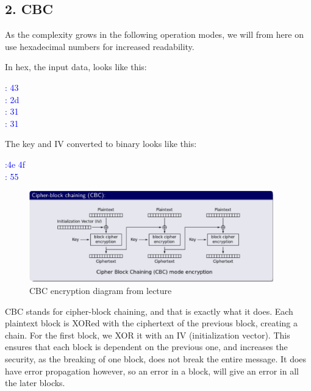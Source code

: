 \documentclass{article}
\begin{document}
\newpage
\subsection{2. CBC}

As the complexity grows in the following operation modes, we will from here on use hexadecimal numbers for increased readability.

In hex, the  input data, looks like this:
\begin{tcolorbox}
\begin{center}
\textcolor{blue}{
: 43\\
: 2d\\
: 31\\
: 31}
\end{center}
\end{tcolorbox}

The key and IV converted to binary looks like this: 
\begin{tcolorbox}
\begin{center}
\textcolor{blue}{
:\qquad4e 4f\\
: 55}
\end{center}
\end{tcolorbox}


\begin{figure}[H]
 \centering
  \includegraphics[width=300pt]{img/cbcLecture.png}
 \caption{CBC encryption diagram from lecture}
 \end{figure}

CBC stands for cipher-block chaining, and that is exactly what it does. Each plaintext block is XORed with the ciphertext of the previous block, creating a chain. For the first block, we XOR it with an IV (initialization vector). This ensures that each block is dependent on the previous one, and increases the security, as the breaking of one block, does not break the entire message. It does have error propagation however, so an error in a block, will give an error in all the later blocks. 
\end{document}
